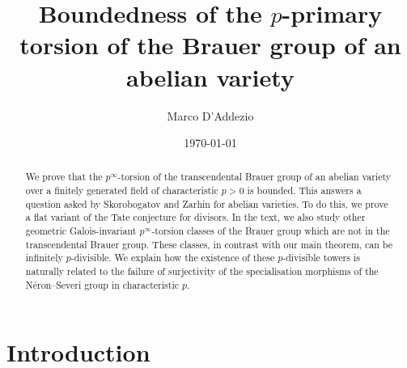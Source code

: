 \documentclass[11pt]{amsart}
\begin{document}
\newtheorem{theo}[subsection]{Theorem}
\newtheorem*{theo*}{Theorem}
\newtheorem{conj}[subsection]{Conjecture}

\newtheorem{prop}[subsection]{Proposition}
\newtheorem{lemm}[subsection]{Lemma}
\newtheorem*{lemm*}{Lemma}
\newtheorem{coro}[subsection]{Corollary}


\theoremstyle{definition}
\newtheorem{defi}[subsection]{Definition}
\newtheorem*{defi*}{Definition}
\newtheorem{hypo}[subsection]{Hypothesis}
\newtheorem{rema}[subsection]{Remark}
\newtheorem{exam}[subsection]{Example}
\newtheorem{nota}[subsection]{Notation}
\newtheorem{cons}[subsection]{Construction}

\setcounter{tocdepth}{1}


\title{Boundedness of the $p$-primary torsion of the Brauer group of an abelian variety}
\author{Marco D'Addezio}
\date{\today}

\address{Institut de Mathématiques de Jussieu-Paris Rive Gauche, SU - 4 place Jussieu, Case 247, 75252 Paris}

\maketitle

\begin{abstract}
We prove that the $p^\infty$-torsion of the transcendental Brauer group of an abelian variety over a finitely generated field of characteristic $p>0$ is bounded. This answers a question asked by Skorobogatov and Zarhin for abelian varieties. To do this, we prove a flat variant of the Tate conjecture for divisors. In the text, we also study other geometric Galois-invariant $p^\infty$-torsion classes of the Brauer group which are not in the transcendental Brauer group. These classes, in contrast with our main theorem, can be infinitely $p$-divisible. We explain how the existence of these $p$-divisible towers is naturally related to the failure of surjectivity of the specialisation morphisms of the Néron--Severi group in characteristic $p$.
\end{abstract}
	\tableofcontents
\section{Introduction}
\end{document}
